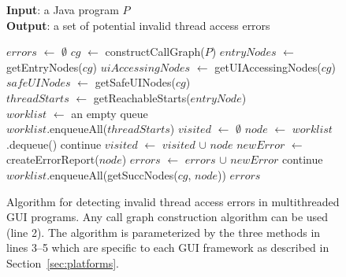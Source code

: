 \begin{figure}[t]
\textbf{Input}: a Java program $\mathit{P}$\\
\textbf{Output}: a set of potential invalid thread access errors\\
\vspace{-4mm}
\begin{algorithmic}[1]
\STATE $\mathit{errors}$ $\leftarrow$ $\emptyset$ 
\STATE $\mathit{cg}$ $\leftarrow$ constructCallGraph($\mathit{P}$)
\STATE $\mathit{entryNodes}$ $\leftarrow$ getEntryNodes($\mathit{cg}$)
\STATE $\mathit{uiAccessingNodes}$ $\leftarrow$ getUIAccessingNodes($\mathit{cg}$)
\STATE $\mathit{safeUINodes}$ $\leftarrow$ getSafeUINodes($\mathit{cg}$)\\
\STATE $\mathit{threadStarts}$ $\leftarrow$ getReachableStarts($\mathit{entryNode}$)\\
\STATE $\mathit{worklist}$ $\leftarrow$ an empty queue\\
\STATE $\mathit{worklist}$.enqueueAll($\mathit{threadStarts}$)
\STATE $\mathit{visited}$ $\leftarrow$ $\emptyset$
\STATE $\mathit{node}$ $\leftarrow$ $\mathit{worklist}$.dequeue()
\STATE continue
\ENDIF
\STATE $\mathit{visited}$ $\leftarrow$ $\mathit{visited}$ $\cup$ $\mathit{node}$
\STATE $\mathit{newError}$ $\leftarrow$ createErrorReport($\mathit{node}$)
\STATE $\mathit{errors}$ $\leftarrow$ $\mathit{errors}$ $\cup$ $\mathit{newError}$
\STATE continue
\ELSE
\STATE $\mathit{worklist}$.enqueueAll(getSuccNodes($\mathit{cg}$, $\mathit{node}$))
\ENDIF 
\ENDWHILE
\ENDFOR
\RETURN $errors$
\vspace{-2mm}
\end{algorithmic}
\caption{Algorithm for detecting invalid thread access errors in multithreaded GUI programs. 
Any call graph construction algorithm can be used (line 2). The algorithm
is parameterized by the three methods in lines 3--5 which are specific to each GUI framework
 as described in Section~\ref{sec:platforms}.
} \label{fig:detectalgorithm}
\end{figure}

